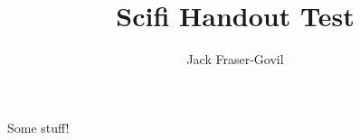\documentclass[theme=scifi]{rpghandout}
\title{Scifi Handout Test}
\author{Jack Fraser-Govil}
\begin{document}
    \maketitle

    Some stuff!
\end{document}

